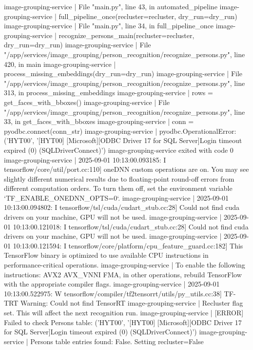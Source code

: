 image-grouping-service  |   File "main.py", line 43, in automated_pipeline
image-grouping-service  |     full_pipeline_once(recluster=recluster, dry_run=dry_run)
image-grouping-service  |   File "main.py", line 34, in full_pipeline_once
image-grouping-service  |     recognize_persons_main(recluster=recluster, dry_run=dry_run)
image-grouping-service  |   File "/app/services/image_grouping/person_recognition/recognize_persons.py", line 420, in main
image-grouping-service  |     process_missing_embeddings(dry_run=dry_run)
image-grouping-service  |   File "/app/services/image_grouping/person_recognition/recognize_persons.py", line 313, in process_missing_embeddings
image-grouping-service  |     rows = get_faces_with_bboxes()
image-grouping-service  |   File "/app/services/image_grouping/person_recognition/recognize_persons.py", line 33, in get_faces_with_bboxes
image-grouping-service  |     conn = pyodbc.connect(conn_str)
image-grouping-service  | pyodbc.OperationalError: ('HYT00', '[HYT00] [Microsoft][ODBC Driver 17 for SQL Server]Login timeout expired (0) (SQLDriverConnect)')
image-grouping-service exited with code 0
image-grouping-service  | 2025-09-01 10:13:00.093185: I tensorflow/core/util/port.cc:110] oneDNN custom operations are on. You may see slightly different numerical results due to floating-point round-off errors from different computation orders. To turn them off, set the environment variable `TF_ENABLE_ONEDNN_OPTS=0`.
image-grouping-service  | 2025-09-01 10:13:00.094802: I tensorflow/tsl/cuda/cudart_stub.cc:28] Could not find cuda drivers on your machine, GPU will not be used.
image-grouping-service  | 2025-09-01 10:13:00.121018: I tensorflow/tsl/cuda/cudart_stub.cc:28] Could not find cuda drivers on your machine, GPU will not be used.
image-grouping-service  | 2025-09-01 10:13:00.121594: I tensorflow/core/platform/cpu_feature_guard.cc:182] This TensorFlow binary is optimized to use available CPU instructions in performance-critical operations.
image-grouping-service  | To enable the following instructions: AVX2 AVX_VNNI FMA, in other operations, rebuild TensorFlow with the appropriate compiler flags.
image-grouping-service  | 2025-09-01 10:13:00.522975: W tensorflow/compiler/tf2tensorrt/utils/py_utils.cc:38] TF-TRT Warning: Could not find TensorRT
image-grouping-service  | Recluster flag set. This will affect the next recognition run.
image-grouping-service  | [ERROR] Failed to check Persons table: ('HYT00', '[HYT00] [Microsoft][ODBC Driver 17 for SQL Server]Login timeout expired (0) (SQLDriverConnect)')
image-grouping-service  | Persons table entries found: False. Setting recluster=False
